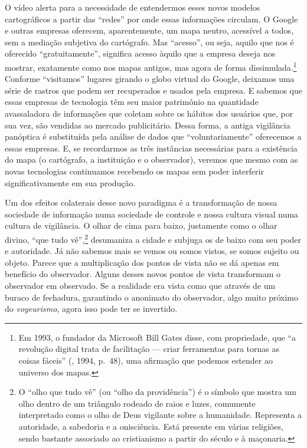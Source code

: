 O vídeo alerta para a necessidade de entendermos esses novos modelos
cartográficos a partir das ``redes'' por onde essas informações
circulam. O Google e outras empresas oferecem, aparentemente, um mapa
neutro, acessível a todos, sem a mediação subjetiva do cartógrafo. Mas
``acesso'', ou seja, aquilo que nos é oferecido ``gratuitamente'',
significa acesso àquilo que a empresa deseja nos mostrar, exatamente
como nos mapas antigos, mas agora de forma dissimulada.\footnote{Em
  1993, o fundador da Microsoft Bill Gates disse, com propriedade, que
  ``a revolução digital trata de facilitação --- criar ferramentas para
  tornas as coisas fáceis'' (, 1994, p.~48), uma afirmação que
  podemos estender ao universo dos mapas.} Conforme
``visitamos'' lugares girando o globo virtual do Google, deixamos uma
série de rastros que podem ser recuperados e usados pela empresa. E
sabemos que essas empresas de tecnologia têm seu maior patrimônio na
quantidade avassaladora de informações que coletam sobre os hábitos dos
usuários que, por sua vez, são vendidas ao mercado publicitário.
Dessa forma, a antiga vigilância panóptica é substituída pela análise
de dados que ``voluntariamente'' oferecemos a essas empresas. E, se
recordarmos as três instâncias necessárias para a existência do mapa (o
cartógrafo, a instituição e o observador), veremos que mesmo com as
novas tecnologias continuamos recebendo os mapas sem poder interferir
significativamente em sua produção.

Um dos efeitos colaterais desse novo paradigma é a transformação de
nossa sociedade de informação numa sociedade de controle e nossa cultura
visual numa cultura de vigilância. O olhar de cima para baixo,
justamente como o olhar divino, ``que tudo vê'',\footnote{O ``olho que tudo
  vê'' (ou ``olho da providência'') é o símbolo que mostra um olho
  dentro de um triângulo rodeado de raios e luzes, comumente
  interpretado como o olho de Deus vigilante sobre a humanidade.
  Representa a autoridade, a sabedoria e a onisciência. Está presente em
  várias religiões, sendo bastante associado ao cristianismo a partir do
  século  e à maçonaria.} desumaniza a cidade e subjuga os de
baixo com seu poder e autoridade. Já não sabemos mais se vemos ou somos
vistos, se somos sujeito ou objeto. Parece que a multiplicação dos
pontos de vista não se dá apenas em benefício do observador. Alguns
desses novos pontos de vista transformam o observador em observado. Se a
realidade era vista como que através de um buraco de fechadura,
garantindo o anonimato do observador, algo muito próximo do
\emph{voyeurismo}, agora isso pode ter se invertido.

